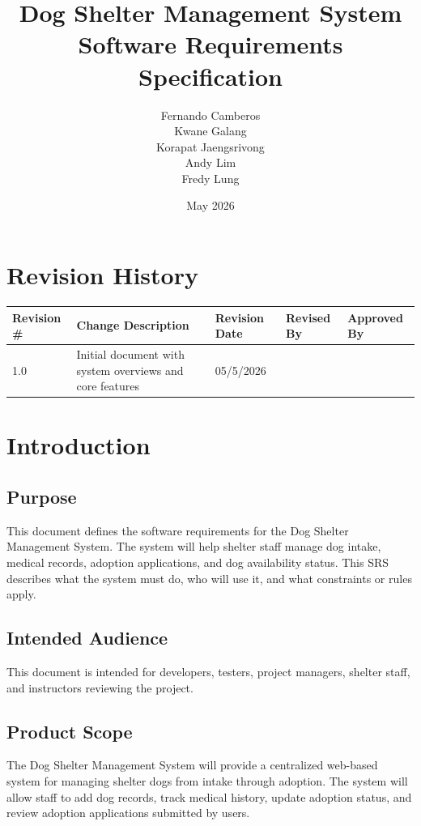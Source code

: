 \documentclass[12pt]{article}
\title{Dog Shelter Management System\\Software Requirements Specification}
\author{Fernando Camberos\\Kwane Galang\\Korapat Jaengsrivong\\Andy Lim\\Fredy Lung}
\date{May 2026}
\begin{document}
\maketitle
\newpage
\tableofcontents
\section*{Revision History}
\begin{longtable}{|p{}|p{}|p{}|p{}|p{}|}
\hline
Revision \# & Change Description & Revision Date & Revised By & Approved By \\
\hline
1.0 & Initial document with system overviews and core features & 05/5/2026 &  &  \\
\hline
\end{longtable}
\newpage
\section{Introduction}
\subsection{Purpose}
This document defines the software requirements for the Dog Shelter Management System. The system will help shelter staff manage dog intake, medical records, adoption applications, and dog availability status. This SRS describes what the system must do, who will use it, and what constraints or rules apply.

\subsection{Intended Audience}
This document is intended for developers, testers, project managers, shelter staff, and instructors reviewing the project.

\subsection{Product Scope}
The Dog Shelter Management System will provide a centralized web-based system for managing shelter dogs from intake through adoption. The system will allow staff to add dog records, track medical history, update adoption status, and review adoption applications submitted by users.
\end{document}
